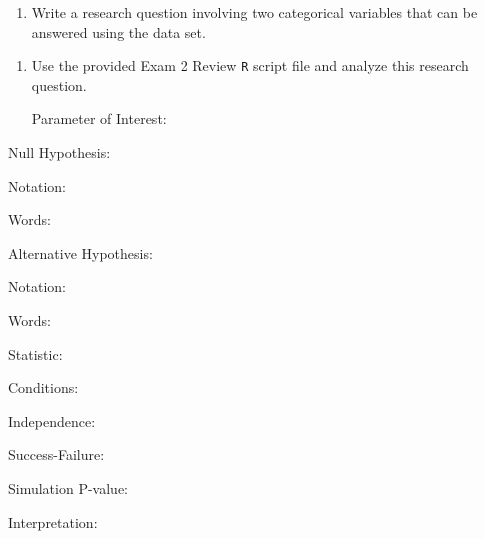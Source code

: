 \documentclass[
]{report}
\providecommand{\tightlist}{%
  \setlength{\itemsep}{0pt}\setlength{\parskip}{0pt}}
\newcommand{\rgi}{\hspace{24pt}}  %
\begin{document}
\vspace{0.8in}

\begin{enumerate}
\def\labelenumi{\arabic{enumi}.}
\setcounter{enumi}{2}
\tightlist
\item
  Write a research question involving two categorical variables that can be answered using the data set.
\end{enumerate}

\vspace{0.8in}

\begin{enumerate}
\def\labelenumi{\arabic{enumi}.}
\setcounter{enumi}{3}
\item
  Use the provided Exam 2 Review \texttt{R} script file and analyze this research question.

  \rgi Parameter of Interest:
\end{enumerate}

\vspace{0.3in}

\rgi Null Hypothesis:

\rgi \rgi Notation:

\vspace{0.3in}

\rgi \rgi Words:

\vspace{0.5in}

\rgi Alternative Hypothesis:

\rgi \rgi Notation:

\vspace{0.3in}

\rgi \rgi Words:

\vspace{0.5in}

\rgi Statistic:

\vspace{0.3in}

\rgi Conditions:

\rgi \rgi Independence:

\vspace{0.8in}

\rgi \rgi Success-Failure:

\vspace{0.8in}

\rgi Simulation P-value:

\vspace{0.3in}

\rgi \rgi Interpretation:

\vspace{0.8in}
\end{document}
